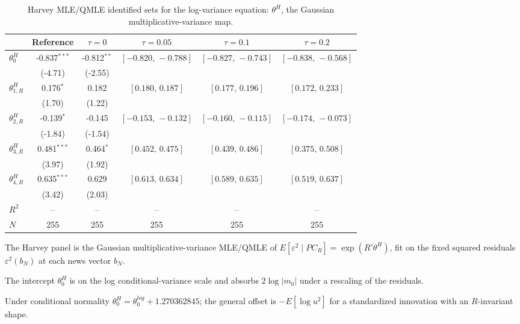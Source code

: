 \begin{table}[!htbp]
\centering
\begin{threeparttable}
\caption{Harvey MLE/QMLE identified sets for the log-variance equation: $\theta^{H}$, the Gaussian multiplicative-variance map.}
\label{tab:log_var_eq_harvey}
\footnotesize\setlength{\tabcolsep}{3pt}
\begin{tabular}{lccccc}
\toprule
 & Reference & $\tau{=}0$ & $\tau{=}0.05$ & $\tau{=}0.1$ & $\tau{=}0.2$ \\
\midrule
$\theta^{H}_0$ & -0.837$^{***}$ & -0.812$^{**}$ & $[-0.820,\,-0.788]$ & $[-0.827,\,-0.743]$ & $[-0.838,\,-0.568]$ \\
 & (-4.71) & (-2.55) &  &  &  \\
\midrule
$\theta^{H}_{1,R}$ & 0.176$^{*}$ & 0.182 & $[0.180,\,0.187]$ & $[0.177,\,0.196]$ & $[0.172,\,0.233]$ \\
 & (1.70) & (1.22) &  &  &  \\
$\theta^{H}_{2,R}$ & -0.139$^{*}$ & -0.145 & $[-0.153,\,-0.132]$ & $[-0.160,\,-0.115]$ & $[-0.174,\,-0.073]$ \\
 & (-1.84) & (-1.54) &  &  &  \\
$\theta^{H}_{3,R}$ & 0.481$^{***}$ & 0.464$^{*}$ & $[0.452,\,0.475]$ & $[0.439,\,0.486]$ & $[0.375,\,0.508]$ \\
 & (3.97) & (1.92) &  &  &  \\
$\theta^{H}_{4,R}$ & 0.635$^{***}$ & 0.629 & $[0.613,\,0.634]$ & $[0.589,\,0.635]$ & $[0.519,\,0.637]$ \\
 & (3.42) & (2.03) &  &  &  \\
$R^2$ & -- & -- & -- & -- & -- \\
$N$ & 255 & 255 & 255 & 255 & 255 \\
\bottomrule
\end{tabular}
\begin{tablenotes}[flushleft]
\scriptsize
\item The Harvey panel is the Gaussian multiplicative-variance MLE/QMLE of $E[\varepsilon^2 \mid PC_R] = \exp(R'\theta^{H})$, fit on the fixed squared residuals $\varepsilon^2(b_N)$ at each news vector $b_N$.
\item The intercept $\theta^{H}_0$ is on the log conditional-variance scale and absorbs $2\log|m_0|$ under a rescaling of the residuals.
\item Under conditional normality $\theta^{H}_0 = \theta^{log}_0 + 1.270362845$; the general offset is $-E[\log u^2]$ for a standardized innovation with an $R$-invariant shape.

\end{tablenotes}
\end{threeparttable}
\end{table}
